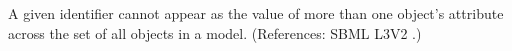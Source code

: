A given identifier cannot appear as the value of more than one
\InitialAssignment{} object's  attribute across the set of
all \InitialAssignment{} objects in a model.  (References: SBML L3V2
.)
